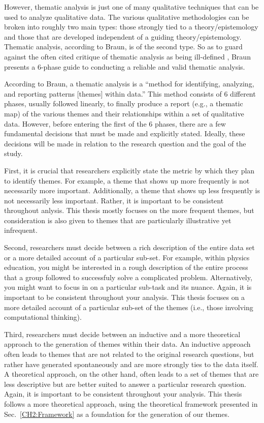 \documentclass{msuphddissertation}
\begin{document}
\begin{doublespace}
However, thematic analysis is just one of many qualitative techniques that can be used to analyze qualitative data.  The various qualitative methodologies can be broken into roughly two main types: those strongly tied to a theory/epistemology and those that are developed independent of a guiding theory/epistemology.  Thematic analysis, according to Braun, is of the second type.  So as to guard against the often cited critique of thematic analysis as being ill-defined \cite{Antaki2002}, Braun presents a 6-phase guide to conducting a reliable and valid thematic analysis.

According to Braun, a thematic analysis is a ``method for identifying, analyzing, and reporting patterns [themes] within data.''  This method consists of $6$ different phases, usually followed linearly, to finally produce a report (e.g., a thematic map) of the various themes and their relationships within a set of qualitative data.  However, before entering the first of the $6$ phases, there are a few fundamental decisions that must be made and explicitly stated.  Ideally, these decisions will be made in relation to the research question and the goal of the study.

First, it is crucial that researchers explicitly state the metric by which they plan to identify themes.  For example, a theme that shows up more frequently is not necessarily more important.  Additionally, a theme that shows up less frequently is not necessarily less important.  Rather, it is important to be consistent throughout anlysis.  This thesis mostly focuses on the more frequent themes, but consideration is also given to themes that are particularly illustrative yet infrequent.

Second, researchers must decide between a rich description of the entire data set or a more detailed account of a particular sub-set.  For example, within physics education, you might be interested in a rough description of the entire process that a group followed to successfuly solve a complicated problem.  Alternatively, you might want to focus in on a particular sub-task and its nuance.  Again, it is important to be consistent throughout your analysis.  This thesis focuses on a more detailed account of a particular sub-set of the themes (i.e., those involving computational thinking).

Third, researchers must decide between an inductive and a more theoretical approach to the generation of themes within their data.  An inductive approach often leads to themes that are not related to the original research questions, but rather have generated spontaneously and are more strongly ties to the data itself.  A theoretical approach, on the other hand, often leads to a set of themes that are less descriptive but are better suited to answer a particular research question.  Again, it is important to be consistent throughout your analysis.  This thesis follows a more theoretical approach, using the theoretical framework presented in Sec.~\ref{CH2:Framework} as a foundation for the generation of our themes.


\end{doublespace}
\end{document}
